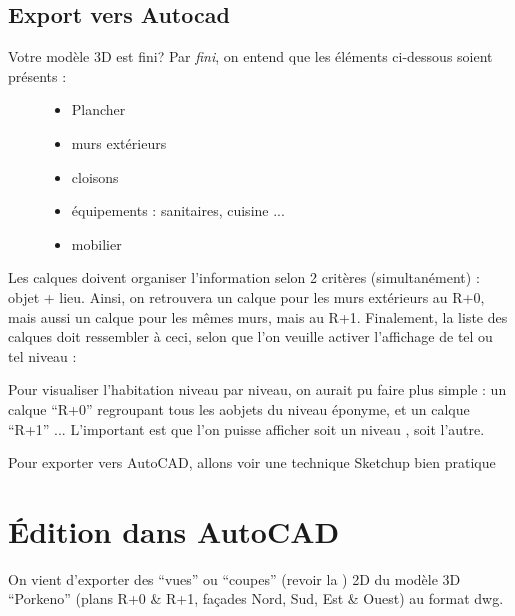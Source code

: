 \documentclass[a4paper,12pt,french]{sphinxmanual}
\begin{document}
\subsection{Export vers Autocad}
\label{init_su+acad/003_su1:export-vers-autocad}\begin{description}
\item[{Votre modèle 3D est fini? Par \emph{fini}, on entend que les éléments ci-dessous soient présents :}] \leavevmode\begin{itemize}
\item {} 
Plancher

\item {} 
murs extérieurs

\item {} 
cloisons

\item {} 
équipements : sanitaires, cuisine ...

\item {} 
mobilier

\end{itemize}

\end{description}

Les calques doivent organiser l'information selon 2 critères (simultanément) : objet + lieu. Ainsi, on retrouvera un calque pour les murs extérieurs au R+0, mais aussi un calque pour les mêmes murs, mais au R+1. Finalement, la liste des calques doit ressembler à ceci, selon que l'on veuille activer l'affichage de tel ou tel niveau :
\begin{figure}[htbp]
\centering

\noindent{}
\end{figure}
\begin{figure}[htbp]
\centering

\noindent{}
\end{figure}

Pour visualiser l'habitation niveau par niveau, on aurait pu faire plus simple : un calque ``R+0'' regroupant tous les aobjets du niveau éponyme, et un calque ``R+1'' ... L'important est que l'on puisse afficher soit un niveau , soit l'autre.

Pour exporter vers AutoCAD, allons voir une technique Sketchup bien pratique {\hyperref[su/export\string-dwg:export\string-dwg]{}}


\section{Édition dans AutoCAD}
\label{init_su+acad/004_acad1:edition-dans-autocad}\label{init_su+acad/004_acad1::doc}
On vient d'exporter des ``vues'' ou ``coupes'' (revoir la {\hyperref[su/export\string-dwg:export\string-dwg]{}} ) 2D du modèle 3D ``Porkeno'' (plans R+0 \& R+1, façades Nord, Sud, Est \& Ouest) au format dwg.
\end{document}
